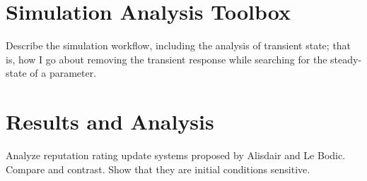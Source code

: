 \section{Simulation Analysis Toolbox} %
\label{sec:simulation_analysis_toolbox_dynamic}
Describe the simulation workflow, including the analysis of transient state; that is, how I go about removing the transient response while searching for the steady-state of a parameter.

\section{Results and Analysis} %
\label{sec:results_and_analysis_dynamic}
Analyze reputation rating update systems proposed by Alisdair and Le Bodic. Compare and contrast. Show that they are initial conditions sensitive.
